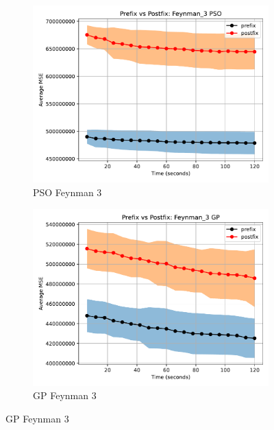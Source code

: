 \documentclass[runningheads]{llncs}
\begin{document}
\begin{figure}
    \vspace{0.5cm}
    
    \begin{subfigure}[b]{0.4\textwidth}
        \includegraphics[width=\linewidth, keepaspectratio]{AIFeynman_Benchmarks/PrePostFeynman_3PSO.pdf}
        \caption{PSO Feynman 3}
        \label{subfig:feynman_3_PSO}
    \end{subfigure}
    \begin{subfigure}[b]{0.4\textwidth}
        \includegraphics[width=\linewidth, keepaspectratio]{AIFeynman_Benchmarks/PrePostFeynman_3GP.pdf}
        \caption{GP Feynman 3}
        \label{subfig:feynman_3_GP}
    \end{subfigure}
    

\end{figure}
\end{document}
